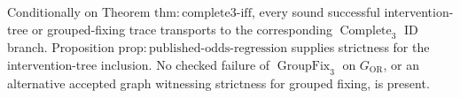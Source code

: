 Conditionally on Theorem \(\mathrm{thm{:}complete3\text{-}iff}\), every sound successful intervention-tree or grouped-fixing trace transports to the corresponding \(\operatorname{Complete}_3\) \(\mathrm{ID}\) branch. Proposition \(\mathrm{prop{:}published\text{-}odds\text{-}regression}\) supplies strictness for the intervention-tree inclusion. No checked failure of \(\operatorname{GroupFix}_3\) on \(G_{\mathrm{OR}}\), or an alternative accepted graph witnessing strictness for grouped fixing, is present.